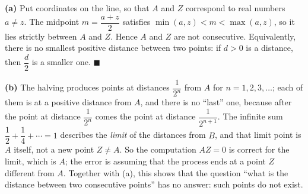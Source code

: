 \textbf{(a)} Put coordinates on the line, so that $A$ and $Z$ correspond to real numbers $a\ne z$. The midpoint $m=\dfrac{a+z}{2}$ satisfies $\min(a,z)<m<\max(a,z)$, so it lies strictly between $A$ and $Z$. Hence $A$ and $Z$ are not consecutive. Equivalently, there is no smallest positive distance between two points: if $d>0$ is a distance, then $\dfrac {d}{2}$ is a smaller one. $\blacksquare$

\textbf{(b)} The halving produces points at distances $\dfrac{1}{2^n}$ from $A$ for $n=1,2,3,\dots$; each of them is at a positive distance from $A$, and there is no ``last'' one, because after the point at distance $\dfrac{1}{2^n}$ comes the point at distance $\dfrac{1}{2^{n+1}}$. The infinite sum $\dfrac{1}{2}+\dfrac{1}{4}+\cdots=1$ describes the \emph{limit} of the distances from $B$, and that limit point is $A$ itself, not a new point $Z\ne A$. So the computation $AZ=0$ is correct for the limit, which is $A$; the error is assuming that the process ends at a point $Z$ different from $A$. Together with (a), this shows that the question ``what is the distance between two consecutive points'' has no answer: such points do not exist.
